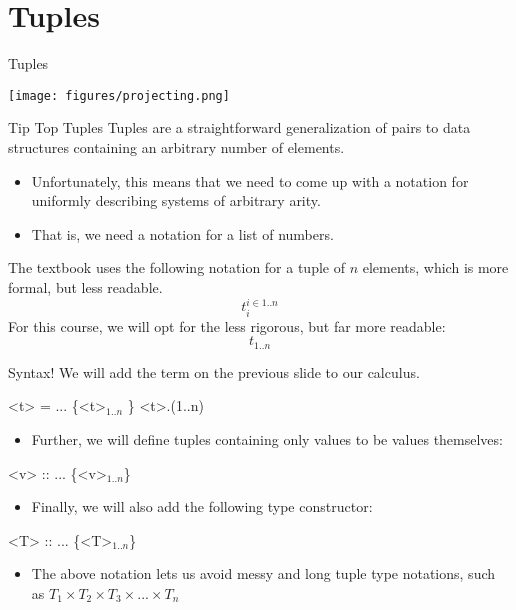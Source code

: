 \documentclass[11pt]{beamer}
\begin{document}
\section[Tuples]{Tuples}
\begin{frame}[fragile=singleslide]{Tuples}
\begin{center}
\texttt{[image: figures/projecting.png]}
\end{center}
\end{frame}


\begin{frame}[fragile=singleslide]{Tip Top Tuples}
Tuples are a straightforward generalization of pairs to data structures containing an arbitrary number of elements.  
\begin{itemize}
\item Unfortunately, this means that we need to come up with a notation for uniformly describing systems of arbitrary arity.  
\item That is, we need a notation for a list of numbers.  
\end{itemize}
The textbook uses the following notation for a tuple of $n$ elements, which is more formal, but less readable.
\begin{equation}
t_i^{i \in 1..n}
\end{equation}
For this course, we will opt for the less rigorous, but far more readable: 
\begin{equation}
t_{1..n}
\end{equation}
\end{frame}


\begin{frame}[fragile=singleslide]{Syntax!}
We will add the term on the previous slide to our calculus.
\begin{grammar}
<t> = ...
\alt \{<t>$_{1..n}$ \}
\alt <t>.(1..n)
\end{grammar}
\begin{itemize}
\item Further, we will define tuples containing only values to be values themselves:
\end{itemize}

\begin{grammar}
<v> :: ...
\alt \{<v>$_{1..n}$\}
\end{grammar}

\begin{itemize}
\item Finally, we will also add the following type constructor:
\end{itemize}

\begin{grammar}
<T> :: ...
\alt \{<T>$_{1..n}$\}
\end{grammar}

\begin{itemize}
\item The above notation lets us avoid messy and long tuple type notations, such as $T_1 \times T_2 \times T_3 \times ... \times T_n$
\end{itemize}
\end{frame}
\end{document}

